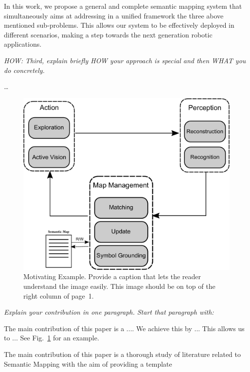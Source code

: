 \documentclass[letterpaper, 10 pt, conference]{ieeeconf}  %
\def\figref#1{Fig.~\ref{#1}}
\begin{document}
In this work, we propose a general and complete semantic mapping system that simultaneously aims at addressing in a unified framework the three above mentioned sub-problems. This allows our system to be effectively deployed in different scenarios, making a step towards the next generation robotic applications.

{\color{blue}\emph{HOW: Third, explain briefly HOW your approach is special and then WHAT 
you do concretely.}}

\dots

\begin{figure}[ht]
  \centering
 \includegraphics[width=0.99\linewidth]{pics/drawing-crop}
 \caption{Motivating Example. Provide a caption that lets the reader
   understand the image easily.  This image should be on top of the
   right column of page~1.}
  \label{fig:motivation}
\end{figure}

{\color{blue}\emph{Explain your contribution in one paragraph. Start that paragraph with:}}

The main contribution of this paper is a ....  We achieve this by
... This allows us to ... See \figref{fig:motivation} for an example.

The main contribution of this paper is a thorough study of literature related to Semantic Mapping with the aim of providing a template
\end{document}
